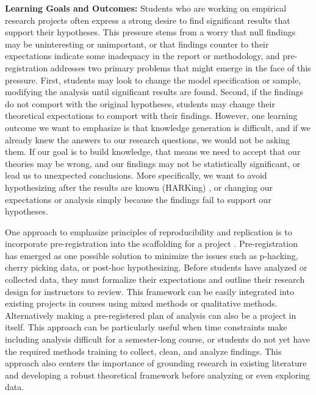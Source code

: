 \documentclass[
  12pt]{article}
\begin{document}
\textbf{Learning Goals and Outcomes:} Students who are working on empirical research projects often express a strong desire to find significant results that support their hypotheses.
This pressure stems from a worry that null findings may be uninteresting or unimportant, or that findings counter to their expectations indicate some inadequacy in the report or methodology, and pre-registration addresses two primary problems that might emerge in the face of this pressure.
First, students may look to change the model specification or sample, modifying the analysis until significant results are found.
Second, if the findings do not comport with the original hypotheses, students may change their theoretical expectations to comport with their findings. 
However, one learning outcome we want to emphasize is that knowledge generation is difficult, and if we already knew the answers to our research questions, we would not be asking them. 
If our goal is to build knowledge, that means we need to accept that our theories may be wrong, and our findings may not be statistically significant, or lead us to unexpected conclusions. 
More specifically, we want to avoid hypothesizing after the results are known (HARKing) \citep{kerr1998harking}, or changing our expectations or analysis simply because the findings fail to support our hypotheses.

One approach to emphasize principles of reproducibility and replication is to incorporate pre-registration into the scaffolding for a project \citep{king2016registered}. 
Pre-registration has emerged as one possible solution to minimize the issues such as p-hacking, cherry picking data, or post-hoc hypothesizing. 
Before students have analyzed or collected data, they must formalize their expectations and outline their research design for instructors to review. 
This framework can be easily integrated into existing projects in courses using mixed methods or qualitative methods. 
Alternatively making a pre-registered plan of analysis can also be a project in itself. 
This approach can be particularly useful when time constraints make including analysis difficult for a semester-long course, or students do not yet have the required methods training to collect, clean, and analyze findings. 
This approach also centers the importance of grounding research in existing literature and developing a robust theoretical framework before analyzing or even exploring data. 
\end{document}
